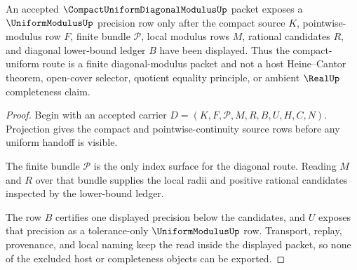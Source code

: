 \begin{theorem}
\label{thm:compact-uniform-diagonal-modulus-uniform-handoff}
An accepted $\CompactUniformDiagonalModulusUp$ packet exposes a $\UniformModulusUp$ precision row only after the compact source $K$, pointwise-modulus row $F$, finite bundle $\mathcal{P}$, local modulus rows $M$, rational candidates $R$, and diagonal lower-bound ledger $B$ have been displayed. Thus the compact-uniform route is a finite diagonal-modulus packet and not a host Heine--Cantor theorem, open-cover selector, quotient equality principle, or ambient $\RealUp$ completeness claim.
\end{theorem}
\begin{proof}
Begin with an accepted carrier $D=(K,F,\mathcal{P},M,R,B,U,H,C,N)$. Projection gives the compact and pointwise-continuity source rows before any uniform handoff is visible.

The finite bundle $\mathcal{P}$ is the only index surface for the diagonal route. Reading $M$ and $R$ over that bundle supplies the local radii and positive rational candidates inspected by the lower-bound ledger.

The row $B$ certifies one displayed precision below the candidates, and $U$ exposes that precision as a tolerance-only $\UniformModulusUp$ row. Transport, replay, provenance, and local naming keep the read inside the displayed packet, so none of the excluded host or completeness objects can be exported.
\end{proof}


\begin{closurestatus}{\CompactUniformDiagonalModulusUp}
  \theoryclosure{\seedClosure}
  \formalstatus{\unformalizedV}
\end{closurestatus}
